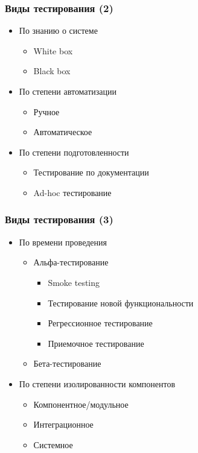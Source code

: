 \documentclass{../../slides-style}
\begin{document}
    \begin{frame}
        \frametitle{Виды тестирования (2)}
        \begin{itemize}
            \item По знанию о системе
            \begin{itemize}
                \item White box
                \item Black box
            \end{itemize}
            \item По степени автоматизации
            \begin{itemize}
                \item Ручное
                \item Автоматическое
            \end{itemize}
            \item По степени подготовленности
            \begin{itemize}
                \item Тестирование по документации
                \item Ad-hoc тестирование
            \end{itemize}
        \end{itemize}
    \end{frame}

    \begin{frame}
        \frametitle{Виды тестирования (3)}
        \begin{itemize}
            \item По времени проведения
            \begin{itemize}
                \item Альфа-тестирование
                \begin{itemize}
                    \item Smoke testing
                    \item Тестирование новой функциональности
                    \item Регрессионное тестирование
                    \item Приемочное тестирование
                \end{itemize}
                \item Бета-тестирование
            \end{itemize}
            \item По степени изолированности компонентов
            \begin{itemize}
                \item Компонентное/модульное
                \item Интеграционное
                \item Системное
            \end{itemize}
        \end{itemize}
    \end{frame}
\end{document}
